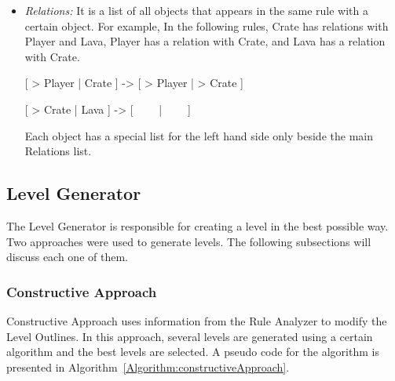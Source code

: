 \documentclass[letterpaper]{article}
\newcommand{\algref}[1]{Algorithm~\ref{Algorithm:#1}}
\begin{document}
\begin{itemize}
	\begin{center}
		[ > Player | \ \ \ \ ] -> [ Crate | Player ]
	\end{center}
	\begin{center}
		[ > Crate | Crate ] -> [ > Crate | > Crate ]
	\end{center}
	\begin{center}
		[ Gem | Crate | Gem ] -> [ Crate | Crate | Crate ]
	\end{center}
	The number of Crate objects in each rule are 0, 2, 1 respectively. In normal case, the minimum number of Crate object will be 2. Since Crate object have Create behavior (in both the first and the third rule) then the minimum number of objects will be zero instead.
	\item \emph{Relations:} It is a list of all objects that appears in the same rule with a certain object. For example, In the following rules, Crate has relations with Player and Lava, Player has a relation with Crate, and Lava has a relation with Crate.
	\begin{center}
		[ > Player | Crate ] -> [ > Player | > Crate ]
	\end{center}
	\begin{center}
		[ > Crate | Lava ] -> [ \ \ \ \ | \ \ \ \ ]
	\end{center}
	Each object has a special list for the left hand side only beside the main Relations list.	
\end{itemize}

\subsection{Level Generator}
The Level Generator is responsible for creating a level in the best possible way. Two approaches were used to generate levels. The following subsections will discuss each one of them.

\subsubsection{Constructive Approach}\label{Section:constructiveApproach}
Constructive Approach uses information from the Rule Analyzer to modify the Level Outlines. In this approach, several levels are generated using a certain algorithm and the best levels are selected. A pseudo code for the algorithm is presented in \algref{constructiveApproach}.\\
\end{document}
